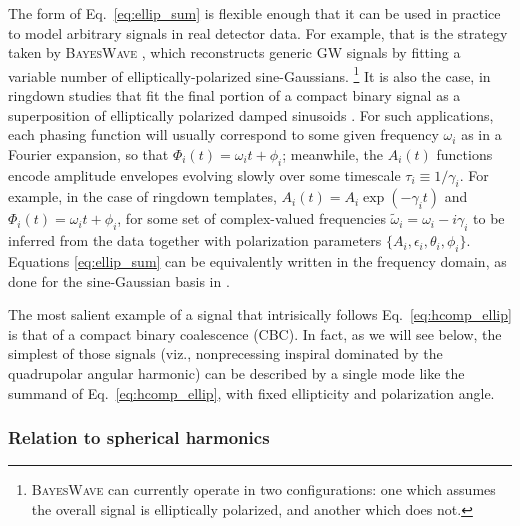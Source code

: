 \documentclass[aps,prd,twocolumn,superscriptaddress,preprintnumbers,floatfix,nofootinbib]{revtex4-2}
\newcommand*{\eq}[1]{Eq.~\eqref{eq:#1}}
\begin{document}
The form of Eq.~\eqref{eq:ellip_sum} is flexible enough that it can be used in practice to model arbitrary signals in real detector data.
For example, that is the strategy taken by \textsc{BayesWave} \cite{Cornish:2014kda,Cornish:2020dwh}, which reconstructs generic GW signals by fitting a variable number of elliptically-polarized sine-Gaussians.%
\footnote{\textsc{BayesWave} can currently operate in two configurations: one which assumes the overall signal is elliptically polarized, and another which does not.}
It is also the case, in ringdown studies that fit the final portion of a compact binary signal as a superposition of elliptically polarized damped sinusoids \cite{Isi:2021iql}.
%
For such applications, each phasing function will usually correspond to some given frequency $\omega_i$ as in a Fourier expansion, so that $\Phi_i(t) = \omega_i t + \phi_i$; meanwhile, the $A_i(t)$ functions encode amplitude envelopes evolving slowly over some timescale $\tau_i \equiv 1/\gamma_i$.
For example, in the case of ringdown templates, $A_i(t) = A_i \exp(-\gamma_i t)$ and $\Phi_i(t) = \omega_i t + \phi_i$, for some set of complex-valued frequencies $\tilde{\omega}_i = \omega_i - i\gamma_i$ to be inferred from the data together with polarization parameters $\{ A_i, \epsilon_i, \theta_i, \phi_i\}$.
Equations \eqref{eq:ellip_sum} can be equivalently written in the frequency domain, as done for the sine-Gaussian basis in \cite{Cornish:2014kda,Cornish:2020dwh}.

The most salient example of a signal that intrisically follows \eq{hcomp_ellip} is that of a compact binary coalescence (CBC).
In fact, as we will see below, the simplest of those signals (viz., nonprecessing inspiral dominated by the quadrupolar angular harmonic) can be described by a single mode like the summand of \eq{hcomp_ellip}, with fixed ellipticity and polarization angle.


\subsubsection{Relation to spherical harmonics}
\label{sec:harmonics}
\end{document}
